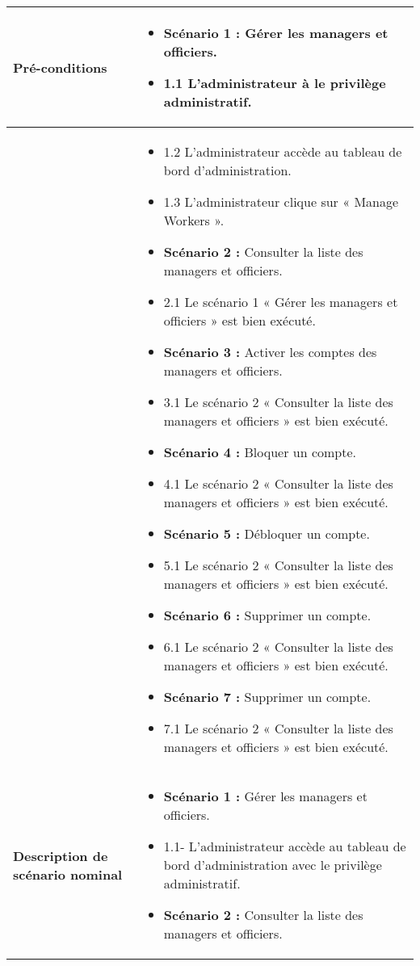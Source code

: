 \begin{longtable}{|>{\arraybackslash}p{4.2cm}|>{\arraybackslash}p{12.5cm}|}
\textbf{Pré-conditions} &
\begin{itemize}[label=]
  \item \textbf{Scénario 1 :} Gérer les managers et officiers.
  \item 1.1 L'administrateur à le privilège administratif.
\end{itemize} \\
\hline
\textbf{} &
\begin{itemize}[label=]
\item 1.2 L'administrateur accède au tableau de bord d'administration.
\item 1.3 L'administrateur clique sur « Manage Workers ».


  \item \textbf{Scénario 2 :} Consulter la liste des managers et officiers.
  \item 2.1 Le scénario 1 « Gérer les managers et officiers » est bien exécuté.

  \item \textbf{Scénario 3 :} Activer les comptes des managers et officiers.
  \item 3.1 Le scénario 2 « Consulter la liste des managers et officiers » est bien exécuté.

  \item \textbf{Scénario 4 :} Bloquer un compte.
  \item 4.1 Le scénario 2 « Consulter la liste des managers et officiers » est bien exécuté.

  \item \textbf{Scénario 5 :} Débloquer un compte.
  \item 5.1 Le scénario 2 « Consulter la liste des managers et officiers » est bien exécuté.

  \item \textbf{Scénario 6 :} Supprimer un compte.
  \item 6.1 Le scénario 2 « Consulter la liste des managers et officiers » est bien exécuté.
  \item \textbf{Scénario 7 :} Supprimer un compte.
  \item 7.1 Le scénario 2 « Consulter la liste des managers et officiers » est bien exécuté.

\end{itemize} \\
\hline
\textbf{Description de scénario nominal} &
\begin{itemize}[label=]
  \item \textbf{Scénario 1 :} Gérer les managers et officiers.
  \item 1.1- L'administrateur accède au tableau de bord d'administration avec le privilège administratif.
  \item \textbf{Scénario 2 :} Consulter la liste des managers et officiers.



\end{itemize}
\end{longtable}
